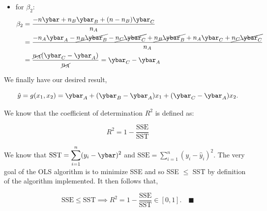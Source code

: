 \documentclass[12pt]{article}
\newcommand{\snmath}{\displaystyle\sum_{i=1}^n}
\newcommand{\na}{n_A}
\newcommand{\nb}{n_B}
\newcommand{\nc}{n_C}
\begin{document}
\begin{enumerate}
\begin{tcolorbox}[colback = white, sharp corners]
\begin{itemize}
\item for $\beta_2$:
\begin{align*}
	\beta_2 &= \dfrac{- n \ybar + \nb  \ybar_B +  (n - \nb) \ybar_C }{\na} \\
	 &= \dfrac{- \na \ybar_A  - \cancel{\nb \ybar_B} - \cancel{\nc \ybar_C} + \cancel{\nb \ybar_B} + \na \ybar_C +  \cancel{\nc \ybar_C} }{\na} \\
	 &= \dfrac{\cancel{\na} (\ybar_C - \ybar_A)}{\cancel{\na}} = \ybar_C - \ybar_A
\end{align*}
\end{itemize}

We finally have our desired result, 

\[
	\hat{y} = g(x_1, x_2) = \ybar_A + (\ybar_B - \ybar_A) x_1 + (\ybar_C - \ybar_A) x_2 .
\]

\vspace{3mm}

\end{tcolorbox}

\newpage


\begin{tcolorbox}[colback=white, sharp corners]

We know that the coefficient of determination $R^2$ is defined as: 

\[
	R^2 = 1 - \dfrac{\mathrm{SSE}}{\mathrm{SST}}
\]

We know that $\mathrm{SST} = \snmath (y_i - \ybar)^2 $ and $\mathrm{SSE} = \snmath (y_i - \hat{y}_i)^2$. The very goal of the OLS algorithm is to minimize SSE and so SSE $\leq$ SST by definition of the algorithm implemented. It then follows that,

\[
	\mathrm{SSE} \leq \mathrm{SST} \implies R^2 = 1 - \dfrac{\mathrm{SSE}}{\mathrm{SST}} \in [0,1]. \quad \blacksquare
\]

\end{tcolorbox}

\end{enumerate}
\end{document}
